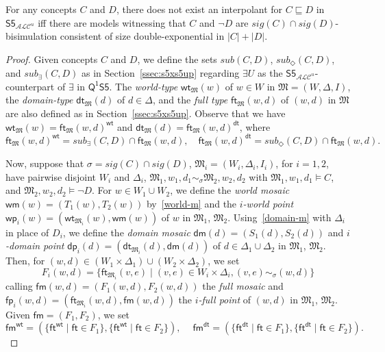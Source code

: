 \documentclass{lmcs} %
\theoremstyle{plain}\newtheorem{satz}[thm]{Satz} %
\newcommand{\nz}[1]{\textcolor{blue}{\bf!}%
	\marginpar[\parbox{15mm}{\raggedleft\scriptsize\textcolor{blue}{#1}}]%
	{\parbox{15mm}{\raggedright\scriptsize\textcolor{blue}{#1}}}}
\newcommand{\sub}{\textit{sub}}
\newcommand{\sig}{\mathit{sig}}
\newcommand{\FOMS}{\ensuremath{\mathsf{Q^1S5}}}
\newcommand{\ALCS}{\ensuremath{\mathsf{S5}_{\mathcal{ALC}^u}}}
\newcommand{\wt}{\mathsf{wt}}
\newcommand{\dt}{\mathsf{dt}}
\newcommand{\ft}{\mathsf{ft}}
\newcommand{\wm}{\mathsf{wm}}
\newcommand{\dm}{\mathsf{dm}}
\newcommand{\iwp}{\mathsf{wp}_i}
\newcommand{\idp}{\mathsf{dp}_i}
\newcommand{\pet}{\ft}
\newcommand{\pam}{\mathsf{fm}}
\newcommand{\ipp}{\mathsf{fp}_i}
\newcommand{\ALCIOS}{\ensuremath{\mathsf{S5}_{\mathcal{ALC}^u}}}
\begin{document}
\begin{thm}\label{th:sizeboundALC}
	For any concepts $C$ and $D$, there does not exist an interpolant for $C \sqsubseteq D$ in $\ALCIOS$ iff there are  models witnessing that $C$ and $\neg D$ are $\sig(C)\cap \sig(D)$-bisimulation consistent of size double-exponential in $|C|+|D|$. 
\end{thm}
%
\begin{proof}
Given concepts $C$ and $D$, we define the sets $\sub(C,D)$, $\sub_{\Diamond}(C,D)$, and $\sub_{\exists}(C,D)$ as in Section~\ref{ssec:s5xs5up} regarding $\exists U$ as the $\ALCS$-counterpart of $\exists$ in $\FOMS$. 
%
The \emph{world-type} $\wt_{\mathfrak{M}}(w)$ of $w \in W$ in $\mathfrak{M} = (W,\Delta,I)$, the  \emph{domain-type} $\dt_{\mathfrak{M}}(d)$ of $d \in \Delta$, and the \emph{full type} $\pet_{\mathfrak{M}}(w,d)$ of $(w,d)$ in $\mathfrak{M}$ are also defined as in Section~\ref{ssec:s5xs5up}. 
%
Observe that we have $\wt_{\mathfrak{M}}(w) = \pet_{\mathfrak{M}}(w,d)^{\wt}$ and $\dt_{\mathfrak{M}}(d) = \pet_{\mathfrak{M}}(w,d)^{\dt}$, where
%
$$
\pet_{\mathfrak{M}}(w,d)^{\wt}= \sub_{\exists}(C,D) \cap \pet_{\mathfrak{M}}(w,d),\quad 
\pet_{\mathfrak{M}}(w,d)^{\dt} = \sub_{\Diamond}(C,D) \cap \pet_{\mathfrak{M}}(w,d). 
$$

Now, suppose that $\sigma = \sig(C) \cap \sig(D)$, $\mathfrak{M}_{i}= (W_{i},\Delta_{i},I_{i})$, for $i = 1,2$, have pairwise disjoint $W_i$ and $\Delta_i$, $\mathfrak{M}_{1},w_{1},d_{1} \sim_{\sigma} \mathfrak{M}_{2},w_{2},d_{2}$  with $\mathfrak{M}_{1},w_{1},d_1 \models C$, and $\mathfrak{M}_{2},w_{2}, d_2 \models\neg D$. 
%
For $w\in W_{1}\cup W_{2}$, we  define the \emph{world mosaic} $\wm(w) = (T_{1}(w),T_{2}(w))$ by~\eqref{world-m} and the \emph{$i$-world point} $\iwp(w) = (\wt_{\mathfrak{M}_{i}}(w), \wm(w))$ of $w$ in $\mathfrak{M}_{1}$, $\mathfrak{M}_{2}$. Using~\eqref{domain-m} with $\Delta_i$ in place of $D_i$, we define the \emph{domain mosaic} $\dm(d)=(S_{1}(d),S_{2}(d))$ and  \emph{$i$-domain point} $\idp(d) = (\dt_{\mathfrak{M}_{i}}(d),\dm(d))$ of $d \in \Delta_1 \cup \Delta_2$ in $\mathfrak{M}_{1}$, $\mathfrak{M}_{2}$.
%
Then, for $(w,d) \in (W_{1} \times \Delta_{1}) \cup (W_{2} \times \Delta_{2})$, we set
%
$$
F_{i}(w,d) =\{ \pet_{\mathfrak{M}_{i}}(v,e) \mid (v,e)\in W_{i}\times \Delta_{i}, (v,e) \sim_{\sigma} (w,d)\}
$$
%
calling $\pam(w,d)=(F_{1}(w,d),F_{2}(w,d))$ the \emph{full mosaic} and $\ipp(w,d) = (\pet_{\mathfrak{M}_{i}}(w,d),\pam(w,d))$ the \emph{$i$-full point} of $(w,d)$
in $\mathfrak{M}_{1}$, $\mathfrak{M}_{2}$. 
%
Given $\pam=(F_{1},F_{2})$, we set
%
$$
\pam^{\wt} = (\{ \pet^{\wt} \mid \pet\in F_{1}\},\{ \pet^{\wt} \mid \pet\in F_{2}\}),\ \quad 
\pam^{\dt} = (\{ \pet^{\dt} \mid \pet\in F_{1}\},\{ \pet^{\dt} \mid \pet\in F_{2}\}).
$$
%


\end{proof}
\end{document}
